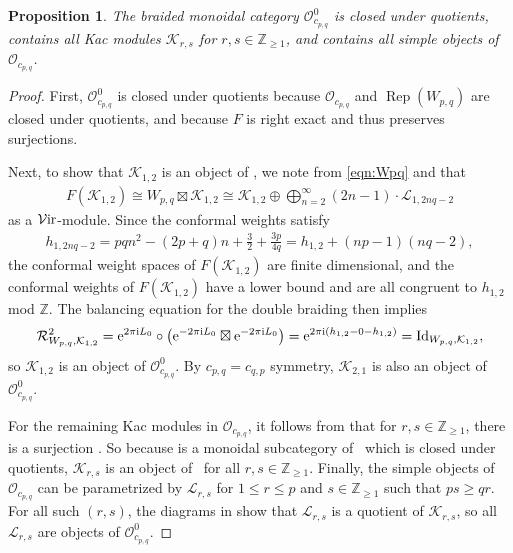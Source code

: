 \documentclass[pdftex]{sigma}
\numberwithin{equation}{section}
\newtheorem{Proposition}[Theorem]{Proposition}
\theoremstyle{definition}
\begin{document}
 \begin{Proposition}\label{prop:Ocpq0-first-properties}
 The braided monoidal category $\mathcal{O}_{c_{p,q}}^0$ is closed under quotients, contains all Kac modules $\mathcal{K}_{r,s}$ for $r,s\in\mathbb{Z}_{\geq 1}$, and contains all simple objects of $\mathcal{O}_{c_{p,q}}$.
 \end{Proposition}
 \begin{proof}
 First, $\mathcal{O}_{c_{p,q}}^0$ is closed under quotients because $\mathcal{O}_{c_{p,q}}$ and $\operatorname{Rep}(W_{p,q})$ are closed under quotients, and because $F$ is right exact and thus preserves surjections.

 Next, to show that $\mathcal{K}_{1,2}$ is an object of , we note from \eqref{eqn:Wpq} and \cite[Theorem 6.8]{MS-cpq-Vir} that
 \begin{gather*}
 F(\mathcal{K}_{1,2})\cong W_{p,q}\boxtimes\mathcal{K}_{1,2}\cong\mathcal{K}_{1,2}\oplus\bigoplus_{n=2}^\infty (2n-1)\cdot\mathcal{L}_{1,2nq-2}
 \end{gather*}
 as a $\mathcal{V}{\rm ir}$-module. Since the conformal weights satisfy
 \begin{gather*}
 h_{1,2nq-2} = pqn^2-(2p+q)n+\frac{3}{2}+\frac{3p}{4q} =h_{1,2}+(np-1)(nq-2),
 \end{gather*}
 the conformal weight spaces of $F(\mathcal{K}_{1,2})$ are finite dimensional, and the conformal weights of $F(\mathcal{K}_{1,2})$ have a lower bound and are all congruent to $h_{1,2}$ mod $\mathbb{Z}$. The balancing equation for the double braiding then implies
 \begin{gather*}
 \mathcal{R}^2_{W_{p,q},\mathcal{K}_{1,2}} = {\rm e}^{2\pi{\rm i }L_0}\circ\bigl({\rm e}^{-2\pi {\rm i} L_0}\boxtimes{\rm e}^{-2\pi{\rm i } L_0}\bigr) = {\rm e}^{2\pi {\rm i }(h_{1,2}-0-h_{1,2})} =\mathrm{Id}_{W_{p,q},\mathcal{K}_{1,2}},
 \end{gather*}
 so $\mathcal{K}_{1,2}$ is an object of $\mathcal{O}_{c_{p,q}}^0$. By $c_{p,q}=c_{q,p}$ symmetry, $\mathcal{K}_{2,1}$ is also an object of $\mathcal{O}_{c_{p,q}}^0$.

 For the remaining Kac modules in $\mathcal{O}_{c_{p,q}}$, it follows from \cite[Theorem 4.7]{MS-cpq-Vir} that for $r,s\in\mathbb{Z}_{\geq 1}$, there is a surjection . So because  is a monoidal subcategory of~ which is closed under quotients, $\mathcal{K}_{r,s}$ is an object of~ for all $r,s\in\mathbb{Z}_{\geq 1}$. Finally, the simple objects of $\mathcal{O}_{c_{p,q}}$ can be parametrized by $\mathcal{L}_{r,s}$ for $1\leq r\leq p$ and $s\in\mathbb{Z}_{\geq 1}$ such that $ps\geq qr$. For all such $(r,s)$, the diagrams in \cite[Section 2.3]{MS-cpq-Vir} show that $\mathcal{L}_{r,s}$ is a quotient of $\mathcal{K}_{r,s}$, so all $\mathcal{L}_{r,s}$ are objects of $\mathcal{O}_{c_{p,q}}^0$.
 \end{proof}
\end{document}
